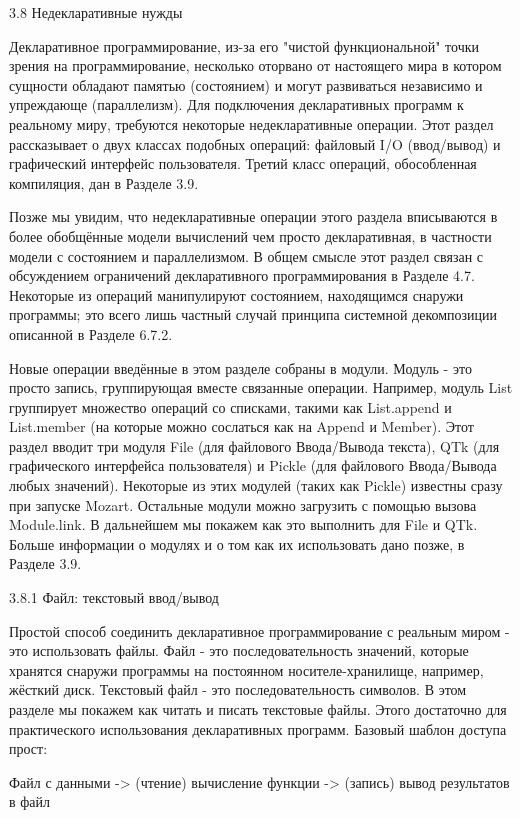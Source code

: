 3.8 Недекларативные нужды

Декларативное программирование, из-за его "чистой функциональной" точки зрения на программирование, несколько оторвано от настоящего мира в котором сущности обладают памятью (состоянием) и могут развиваться независимо и упреждающе (параллелизм). Для подключения декларативных программ к реальному миру, требуются некоторые недекларативные операции. Этот раздел рассказывает о двух классах подобных операций: файловый I/O (ввод/вывод) и графический интерфейс пользователя. Третий класс операций, обособленная компиляция, дан в Разделе 3.9.

Позже мы увидим, что недекларативные операции этого раздела вписываются в более обобщённые модели вычислений чем просто декларативная, в частности модели с состоянием и параллелизмом. В общем смысле этот раздел связан с обсуждением ограничений декларативного программирования в Разделе 4.7. Некоторые из операций манипулируют состоянием, находящимся снаружи программы; это всего лишь частный случай принципа системной декомпозиции описанной в Разделе 6.7.2.

Новые операции введённые в этом разделе собраны в модули. Модуль - это просто запись, группирующая вместе связанные операции. Например, модуль List группирует множество операций со списками, такими как List.append и List.member (на которые можно сослаться как на Append и Member). Этот раздел вводит три модуля File (для файлового Ввода/Вывода текста), QTk (для графического интерфейса пользователя) и Pickle (для файлового Ввода/Вывода любых значений). Некоторые из этих модулей (таких как Pickle) известны сразу при запуске Mozart. Остальные модули можно загрузить с помощью вызова Module.link. В дальнейшем мы покажем как это выполнить для File и QTk. Больше информации о модулях и о том как их использовать дано позже, в Разделе 3.9.

3.8.1 Файл: текстовый ввод/вывод

Простой способ соединить декларативное программирование с реальным миром - это использовать файлы. Файл - это последовательность значений, которые хранятся снаружи программы на постоянном носителе-хранилище, например, жёсткий диск. Текстовый файл - это последовательность символов. В этом разделе мы покажем как читать и писать текстовые файлы. Этого достаточно для практического использования декларативных программ. Базовый шаблон доступа прост:

Файл с данными -> (чтение) вычисление функции -> (запись) вывод результатов в файл

